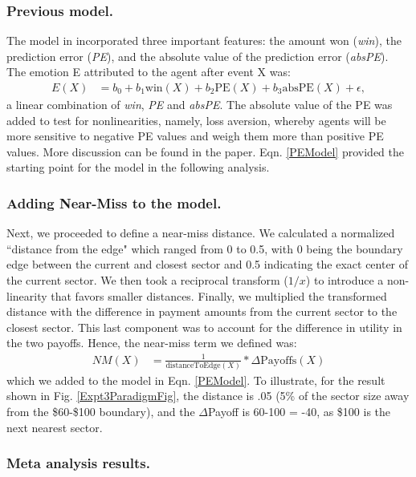 \documentclass[10pt,letterpaper]{article}
\begin{document}
\subsubsection{Previous model.} The model in  incorporated three important features: the amount won (\textit{win}), the prediction error (\textit{PE}), and the absolute value of the prediction error (\textit{absPE}). The emotion E attributed to the agent after event X was:
\begin{align}
E(X) &= b_0 + b_1 \text{win}(X) + b_2 \text{PE}(X) + b_3 \text{absPE}(X) + \epsilon \label{PEModel},
\end{align}
a linear combination of \textit{win}, \textit{PE} and \textit{absPE}. The absolute value of the PE was added to test for nonlinearities, namely, loss aversion, whereby agents will be more sensitive to negative PE values and weigh them more than positive PE values. More discussion can be found in the paper. Eqn. \ref{PEModel} provided the starting point for the model in the following analysis.


\subsubsection{Adding Near-Miss to the model.}

Next, we proceeded to define a near-miss distance. We calculated a normalized ``distance from the edge" which ranged from 0 to 0.5, with 0 being the boundary edge between the current and closest sector and 0.5 indicating the exact center of the current sector. We then took a reciprocal transform ($1/x$) to introduce a non-linearity that favors smaller distances. Finally, we multiplied the transformed distance with the difference in payment amounts from the current sector to the closest sector. This last component was to account for the difference in utility in the two payoffs. Hence, the near-miss term we defined was:
\begin{align}
NM(X) &= \frac{1}{\text{distanceToEdge}(X)} * \Delta\text{Payoffs}(X) \label{NMRegressor}
\end{align}
which we added to the model in Eqn. \ref{PEModel}. To illustrate, for the result shown in Fig. \ref{Expt3ParadigmFig}, the distance is .05 (5\% of the sector size away from the \$60-\$100 boundary), and the $\Delta$Payoff is 60-100 = -40, as \$100 is the next nearest sector.

\subsubsection{Meta analysis results.}
\end{document}
